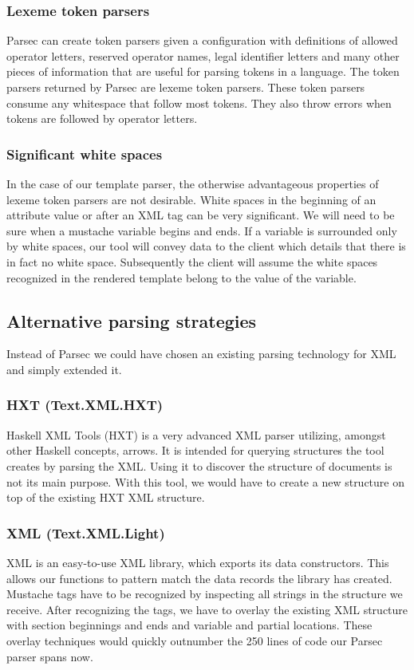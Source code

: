 \documentclass[thesis.tex]{subfiles}
\begin{document}
\subsubsection{Lexeme token parsers}
Parsec can create token parsers given a configuration with definitions of
allowed operator letters, reserved operator names,
legal identifier letters and many other pieces of information
that are useful for parsing tokens in a language.
The token parsers returned by Parsec are lexeme token parsers.
These token parsers consume any whitespace that follow most tokens.
They also throw errors when tokens are followed by operator letters.

\subsubsection{Significant white spaces}
In the case of our template parser, the otherwise advantageous properties
of lexeme token parsers are not desirable.
White spaces in the beginning of an attribute value or after an XML tag can be
very significant.
We will need to be sure when a mustache variable begins and ends.
If a variable is surrounded only by white spaces, our tool will convey
data to the client which details that there is in fact no white space.
Subsequently the client will assume the white spaces recognized in the
rendered template belong to the value of the variable.

\subsection{Alternative parsing strategies}
Instead of Parsec we could have chosen an existing parsing technology for XML
and simply extended it.

\subsubsection{HXT (Text.XML.HXT)}
Haskell XML Tools (HXT) is a very advanced XML parser utilizing, amongst other
Haskell concepts, arrows. It is intended for querying structures the
tool creates by parsing the XML. Using it to discover the structure
of documents is not its main purpose. With this tool, we would have to create a
new structure on top of the existing HXT XML structure.

\subsubsection{XML (Text.XML.Light)}
XML is an easy-to-use XML library, which exports its data constructors.
This allows our functions to pattern match the data records the library has
created.
Mustache tags have to be recognized by inspecting all strings in the
structure we receive. After recognizing the tags, we have to overlay the
existing XML structure with section beginnings and ends and variable and partial
locations.
These overlay techniques would quickly outnumber the 250 lines of code our
Parsec parser spans now.
\end{document}
